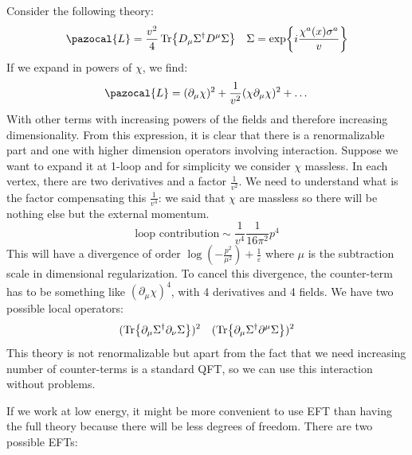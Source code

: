 \documentclass[../main.tex]{subfiles}
\begin{document}
\begin{example}
Consider the following theory:
\[
\pazocal{L}=\frac{v^2}{4}\Tr{D_\mu\Sigma^\dagger D^\mu\Sigma} \quad \Sigma=\exp{i\frac{\chi^a(x)\sigma^a}{v}}
\]
If we expand in powers of $\chi$, we find:
\[
\pazocal{L}=(\partial_\mu\chi)^2+\frac{1}{v^2}(\chi\partial_\mu\chi)^2+\dots
\]
With other terms with increasing powers of the fields and therefore increasing dimensionality. From this expression, it is clear that there is a renormalizable part and one with higher dimension operators involving interaction. Suppose we want to expand it at 1-loop and for simplicity we consider $\chi$ massless. In each vertex, there are two derivatives and a factor $\frac{1}{v^2}$. We need to understand what is the factor compensating this $\frac{1}{v^4}$: we said that $\chi$ are massless so there will be nothing else but the external momentum.
\[
\text{loop contribution}\sim\frac{1}{v^4}\frac{1}{16\pi^2}p^4
\]
This will have a divergence of order $\log\left(-\frac{p^2}{\mu^2}\right)+\frac{1}{\varepsilon}$ where $\mu$ is the subtraction scale in dimensional regularization. To cancel this divergence, the counter-term has to be something like $(\partial_\mu\chi)^4$, with 4 derivatives and 4 fields. We have two possible local operators:
\[
(\Tr{\partial_\mu\Sigma^\dagger\partial_\nu\Sigma})^2 \quad (\Tr{\partial_\mu\Sigma^\dagger\partial^\mu\Sigma})^2
\]
This theory is not renormalizable but apart from the fact that we need increasing number of counter-terms is a standard QFT, so we can use this interaction without problems. 
\end{example}
If we work at low energy, it might be more convenient to use EFT than having the full theory because there will be less degrees of freedom. There are two possible EFTs:
\end{document}
